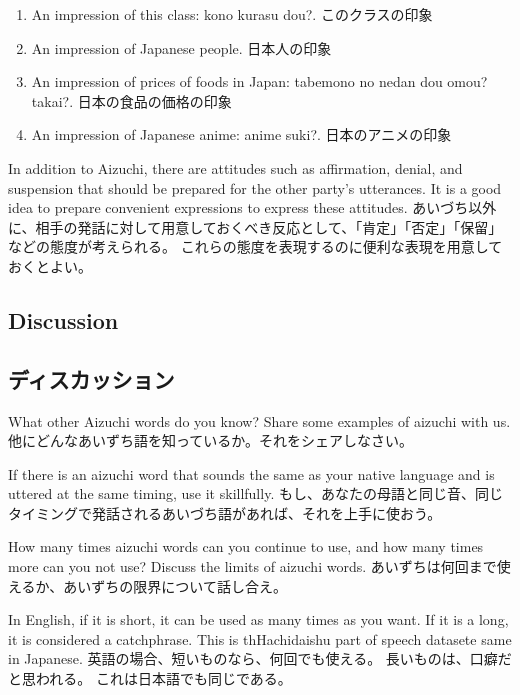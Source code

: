 \documentclass[uplatex,dvipdfmx,b5paper,english,10pt]{jsbook}
\begin{document}
\begin{enumerate}
\item
\ifEnglish
An impression of this class: kono kurasu dou?.
\else
このクラスの印象
\fi
\item
\ifEnglish
An impression of Japanese people.
\else
日本人の印象
\fi
\item
\ifEnglish
An impression of prices of foods in Japan: tabemono no nedan dou omou? takai?.
\else
日本の食品の価格の印象
\fi
\item
\ifEnglish
An impression of Japanese anime: anime suki?.
\else
日本のアニメの印象
\fi
\end{enumerate}

\begin{toianswer} %
\ifEnglish
In addition to Aizuchi, there are attitudes such as affirmation, denial, and suspension that should be prepared for the other party's utterances.
It is a good idea to prepare convenient expressions to express these attitudes.
\else
あいづち以外に、相手の発話に対して用意しておくべき反応として、「肯定」「否定」「保留」などの態度が考えられる。
これらの態度を表現するのに便利な表現を用意しておくとよい。
\fi
\end{toianswer}

\ifEnglish
\subsection{Discussion}
\else
\subsection{ディスカッション}
\fi

\begin{toiquestion}
\ifEnglish
What other Aizuchi words do you know? Share some examples of aizuchi with us.
\else
他にどんなあいずち語を知っているか。それをシェアしなさい。
\fi
\end{toiquestion}
\begin{toianswer}
\ifEnglish
If there is an aizuchi word that sounds the same as your native language and is uttered at the same timing, use it skillfully.
\else
もし、あなたの母語と同じ音、同じタイミングで発話されるあいづち語があれば、それを上手に使おう。
\fi
\end{toianswer}

\begin{toiquestion}
\ifEnglish
How many times aizuchi words can you continue to use, and how many times more can you not use? Discuss the limits of aizuchi words.
\else
あいずちは何回まで使えるか、あいずちの限界について話し合え。
\fi
\end{toiquestion}
\begin{toianswer}
\ifEnglish
In English, if it is short, it can be used as many times as you want.
If it is a long, it is considered a catchphrase.
This is thHachidaishu part of speech datasete same in Japanese.
\else
英語の場合、短いものなら、何回でも使える。
長いものは、口癖だと思われる。
これは日本語でも同じである。
\fi
\end{toianswer}
\end{document}
